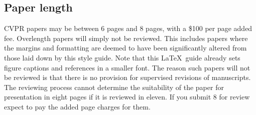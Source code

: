 \documentclass[10pt,twocolumn,letterpaper]{article}
\begin{document}
\subsection{Paper length}
CVPR papers may be between 6 pages and 8 pages, with a \$100 per page added
fee.  Overlength papers will simply not be reviewed.  This includes papers
where the margins and formatting are deemed to have been significantly
altered from those laid down by this style guide.  Note that this
\LaTeX\ guide already sets figure captions and references in a smaller font.
The reason such papers will not be reviewed is that there is no provision for
supervised revisions of manuscripts.  The reviewing process cannot determine
the suitability of the paper for presentation in eight pages if it is
reviewed in eleven.  If you submit 8 for review expect to pay the added page
charges for them. 
\end{document}
